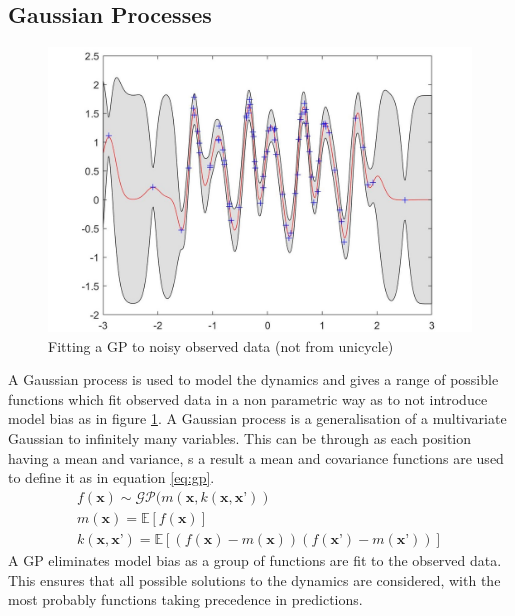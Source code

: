 \documentclass[twoside,twocolumn,12pt]{article}
\begin{document}
\subsection{Gaussian Processes}
\begin{figure}[h!]
  \centering
    \includegraphics[width=\linewidth]{gp}
   \caption{Fitting a GP to noisy observed data (not from unicycle)}
  \label{fig:gp}
\end{figure}
A Gaussian process is used to model the dynamics and gives a range of possible functions which fit observed data in a non parametric way as to not introduce model bias as in figure \ref{fig:gp}. A Gaussian process is a generalisation of a multivariate Gaussian to infinitely many variables. This can be through as each position having a mean and variance, s a result a mean and covariance functions are used to define it as in equation \ref{eq:gp}.
\begin{equation}\label{eq:gp}
\begin{gathered}
f(\textbf{x}) \sim \mathcal{GP}(m(\textbf{x},k(\textbf{x},\textbf{x'})) \\
m(\textbf{x}) = \mathbb{E}[f(\textbf{x})]  \\
k(\textbf{x},\textbf{x'}) = \mathbb{E}[(f(\textbf{x})-m(\textbf{x}))( f(\textbf{x'})-m(\textbf{x'}))]
\end{gathered}
\end{equation}
A GP eliminates model bias as a group of functions are fit to the observed data. This ensures that all possible solutions to the dynamics are considered, with the most probably functions taking precedence in predictions.


\end{document}
